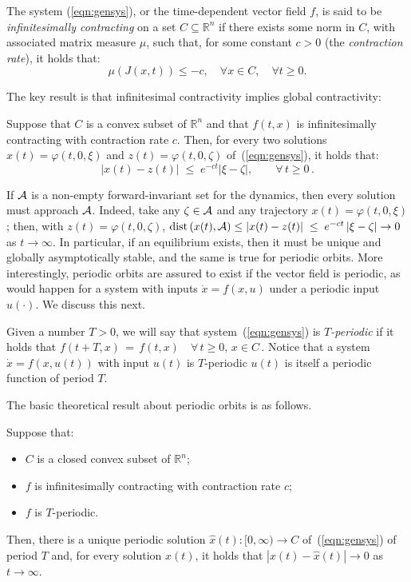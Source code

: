 \documentclass{svmult}
\newcommand{\opteqn}[1]{$#1$}
\newcommand{\optpar}{}  %
\newcommand{\R}{{\mathbb R}}  %
\newcommand{\abs}[1]{\left\vert #1 \right\vert}
\newcommand{\be}[1]{\begin{equation}\label{#1}}
\newcommand{\ee}{\end{equation}}
\newcommand{\cc}{c}
\newcommand{\perorb}{\hat{x}}
\begin{document}
\begin{definition}
The system (\ref{eqn:gensys}), or the time-dependent vector field $f$, is
said to be
\emph{infinitesimally contracting} on a set $C \subseteq \R ^n$ if 
there exists some norm in $C$, with associated matrix measure $\mu $, such that,
for some constant $c>0$ (the \emph{contraction rate}), it holds that:
\begin{equation} \label{eqn:contrcond}
\mu \left(J\left(x,t\right)\right) \le - \cc, \quad \forall x \in C, \quad \forall t \ge 0.
\end{equation}
\end{definition}

The key result is that infinitesimal contractivity implies global contractivity:

\begin{theorem}\label{theo:main}
Suppose that $C$ is a convex subset of $\R^n$ and that $f(t,x)$ is
infinitesimally contracting with contraction rate $\cc$.
Then, for every two solutions $x(t)=\varphi(t,0,\xi )$ and $z(t)=\varphi(t,0,\zeta )$
of~(\ref{eqn:gensys}), it holds that:
\be{eqn:contract}
\abs{x(t)-z(t)} \;\leq \; e^{-\cc t} \abs{\xi -\zeta }, 
\quad\quad\forall\,t\ge 0\,.
\ee
\end{theorem}

If ${\cal A}$ is a non-empty forward-invariant set for the dynamics,
then every solution must approach ${\cal A}$.  Indeed, take any $\zeta \in {\cal A}$ and any
trajectory $x(t)=\varphi(t,0,\xi )$; then, with $z(t)=\varphi(t,0,\zeta )$,
$\mbox{dist}\,(x(t),{\cal A})\leq \abs{x(t)-z(t)} \;\leq \; e^{-\cc t} \abs{\xi -\zeta }\rightarrow 0$
as $t\rightarrow \infty $.  In particular, if an equilibrium exists, then it must be
unique and globally asymptotically stable, and the same is true for periodic
orbits.  More interestingly, periodic orbits are assured to exist if
the vector field is periodic, as would happen for a system with inputs
$\dot x=f(x,u)$ under a periodic input $u(\cdot )$.  We discuss this next.

Given a number $T>0$, we will say that system~(\ref{eqn:gensys}) is
\emph{$T$-periodic} if it holds that 
\opteqn{
f(t+T,x) \,=\, f(t,x) 
\quad\forall\,t\geq 0,\,x\in C\,.
}
Notice that a system $\dot x=f\left(x,u(t)\right)$ with input $u(t)$ is
$T$-periodic $u(t)$ is itself a periodic function of period $T$. 
\optpar
The basic theoretical result about periodic orbits is as follows.

\begin{theorem}\label{theorem:contraction}
Suppose that:
\begin{itemize}
\item $C$ is a closed convex subset of $\R^n$;
\item $f$ is infinitesimally contracting with contraction rate $\cc$;
\item $f$ is $T$-periodic.
\end{itemize}
Then, there is a unique periodic solution $\perorb(t):[0,\infty )\rightarrow C$ of~(\ref{eqn:gensys})
of period $T$ and,
for every solution $x(t)$, it holds that $\abs{x(t)-\perorb(t)}\rightarrow 0$ as $t\rightarrow \infty $.
\end{theorem}
\end{document}
